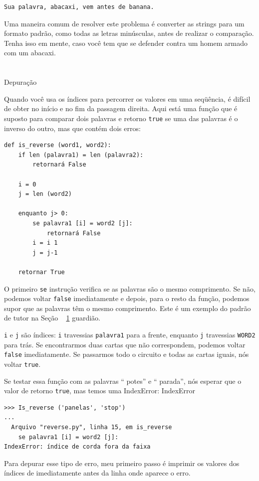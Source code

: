 \documentclass[10pt]{book}
\begin{document}
\begin{verbatim}
Sua palavra, abacaxi, vem antes de banana.
\end{verbatim}
%
Uma maneira comum de resolver este problema é converter as strings para um
formato padrão, como todas as letras minúsculas, antes de realizar o
comparação. Tenha isso em mente, caso você tem que se defender
contra um homem armado com um abacaxi.


\section{} Depuração

Quando você usa os índices para percorrer os valores em uma seqüência,
é difícil de obter no início e no fim da passagem
direita. Aqui está uma função que é suposto para comparar dois
palavras e retorno {\tt true} se uma das palavras é o inverso
do outro, mas que contém dois erros:

\begin{verbatim}
def is_reverse (word1, word2):
    if len (palavra1) = len (palavra2):
        retornará False
    
    i = 0
    j = len (word2)

    enquanto j> 0:
        se palavra1 [i] = word2 [j]:
            retornará False
        i = i 1
        j = j-1

    retornar True
\end{verbatim}
%
O primeiro {\tt se} instrução verifica se as palavras são o
mesmo comprimento. Se não, podemos voltar {\tt false} imediatamente
e depois, para o resto da função, podemos supor que as palavras
têm o mesmo comprimento. Este é um exemplo do padrão de tutor
na Seção ~ \ref {} guardião.

{\tt i} e {\tt j} são índices: {\tt i} travessias {\tt palavra1}
para a frente, enquanto {\tt j} travessias {\tt WORD2} para trás. Se encontrarmos
duas cartas que não correspondem, podemos voltar {\tt false} imediatamente.
Se passarmos todo o circuito e todas as cartas iguais, nós
voltar {\tt true}.

Se testar essa função com as palavras `` potes'' e `` parada'', nós
esperar que o valor de retorno {\tt true}, mas temos uma IndexError:
\index{} IndexError

\begin{verbatim}
>>> Is_reverse ('panelas', 'stop')
...
  Arquivo "reverse.py", linha 15, em is_reverse
    se palavra1 [i] = word2 [j]:
IndexError: índice de corda fora da faixa
\end{verbatim}
%
Para depurar esse tipo de erro, meu primeiro passo é
imprimir os valores dos índices de imediatamente antes da linha
onde aparece o erro.
\end{document}
